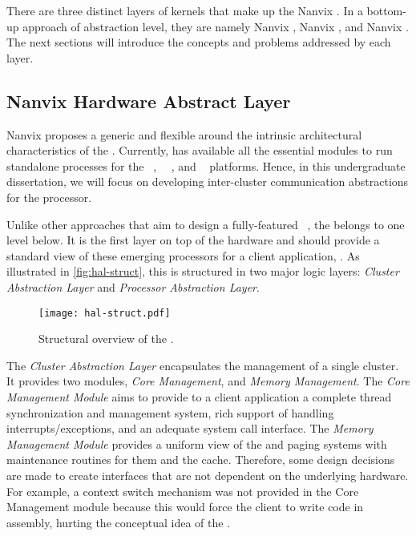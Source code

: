 	There are three distinct layers of kernels that make up the Nanvix \os.
	In a bottom-up approach of abstraction level, they are namely Nanvix \hal,
	Nanvix \microkernel, and Nanvix \multikernel.
	The next sections will introduce the concepts and problems addressed by each layer.

	\subsection{Nanvix Hardware Abstract Layer}
	\label{sec.hal}


		Nanvix \os proposes a generic and flexible \hal around the
		intrinsic architectural characteristics of the \lightweight \manycores.
		Currently, \hal has available all the essential modules to run standalone
		processes for the \mppa~\cite{DeDinechin2013-1}, \optimsoc~~\cite{Wallentowitz2013},
		and \hero~\cite{Kurth2017} platforms.
		Hence, in this undergraduate dissertation, we will focus on developing
		inter-cluster communication abstractions for the \mppa processor.

		Unlike other approaches that aim to design a fully-featured \os~\cite{Baumann2009,kluge2014,nightingale2009,rhoden2011},
		the \hal belongs to one level below.
		It is the first layer on top of the hardware and should provide a standard
		view of these emerging processors for a client application, \eg \os.
		As illustrated in \autoref{fig:hal-struct}, this \hal is structured in
		two major logic layers: \textit{Cluster Abstraction Layer} and \textit{Processor Abstraction Layer}.

		\begin{figure}[!tb]
			\centering%
			\caption{Structural overview of the \hal.}%
			\label{fig:hal-struct}%
			\texttt{[image: hal-struct.pdf]}%
		\end{figure}

		The \textit{Cluster Abstraction Layer} encapsulates the management of a single cluster.
		It provides two modules, \textit{Core Management}, and \textit{Memory Management}.
		The \textit{Core Management Module} aims to provide to a client application a complete
		thread synchronization and management system, rich support of handling
		interrupts/exceptions, and an adequate system call interface.
		The \textit{Memory Management Module} provides a uniform view of the \tlbs
		and paging systems with maintenance routines for them and the cache.
		Therefore, some design decisions are made to create interfaces that are not
		dependent on the underlying hardware.
		For example, a context switch mechanism was not provided in the
		Core Management module because this would force the client \os
		to write code in assembly, hurting the conceptual idea of the \hal.

